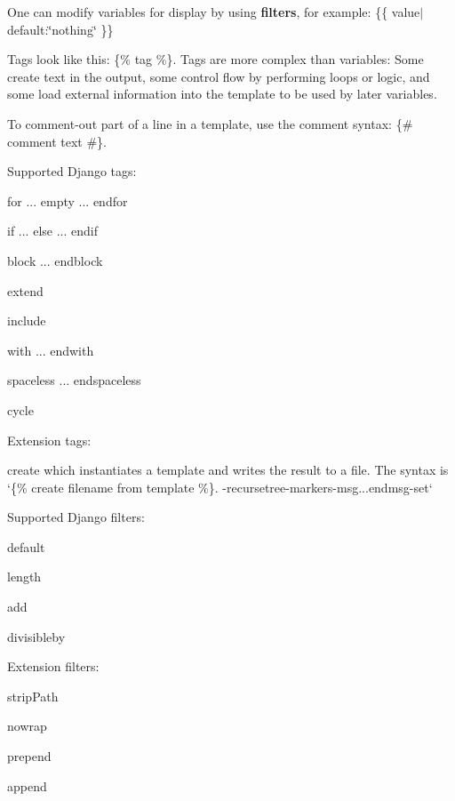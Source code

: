 One can modify variables for display by using {\bfseries filters}, for example\+: {\ttfamily \{\{ value$\vert$default\+:\char`\"{}nothing\char`\"{} \}\}}

Tags look like this\+: {\ttfamily \{\% tag \%\}}. Tags are more complex than variables\+: Some create text in the output, some control flow by performing loops or logic, and some load external information into the template to be used by later variables.

To comment-\/out part of a line in a template, use the comment syntax\+: {\ttfamily \{\# comment text \#\}}.

Supported Django tags\+:
\begin{DoxyItemize}
\item {\ttfamily for ... empty ... endfor}
\item {\ttfamily if ... else ... endif}
\item {\ttfamily block ... endblock}
\item {\ttfamily extend}
\item {\ttfamily include}
\item {\ttfamily with ... endwith}
\item {\ttfamily spaceless ... endspaceless}
\item {\ttfamily cycle}
\end{DoxyItemize}

Extension tags\+:
\begin{DoxyItemize}
\item {\ttfamily create} which instantiates a template and writes the result to a file. The syntax is `\{\% create \textquotesingle{}filename\textquotesingle{} from \textquotesingle{}template\textquotesingle{} \%\}{\ttfamily . -\/}recursetree{\ttfamily  -\/}markers{\ttfamily  -\/}msg{\ttfamily ...}endmsg{\ttfamily  -\/}set`
\end{DoxyItemize}

Supported Django filters\+:
\begin{DoxyItemize}
\item {\ttfamily default}
\item {\ttfamily length}
\item {\ttfamily add}
\item {\ttfamily divisibleby}
\end{DoxyItemize}

Extension filters\+:
\begin{DoxyItemize}
\item {\ttfamily strip\+Path}
\item {\ttfamily nowrap}
\item {\ttfamily prepend}
\item {\ttfamily append} 
\end{DoxyItemize}

